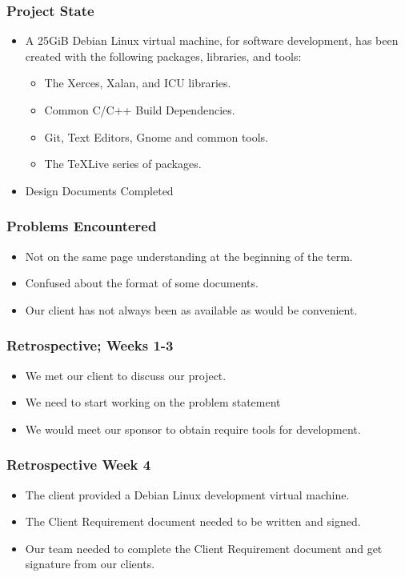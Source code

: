 \documentclass[pdf]{beamer}
\begin{document}
\begin{frame}
  \frametitle{Project State}
  \begin{itemize}
    \item {
      A 25GiB Debian Linux virtual machine, for software development, has been created with the following packages, libraries, and tools:
     \begin{itemize}
       \item The Xerces, Xalan, and ICU libraries.
       \item Common C/C++ Build Dependencies.
       \item Git, Text Editors, Gnome and common tools.
       \item The TeXLive series of packages.
     \end{itemize}
    }
    \item Design Documents Completed
    \end{itemize}
\end{frame}

\begin{frame}
  \frametitle{Problems Encountered}
  \begin{itemize}
    \item Not on the same page understanding at the beginning of the term.
    \item Confused about the format of some documents.
    \item Our client has not always been as available as would be convenient. 
  \end{itemize}
\end{frame}

\begin{frame}
  \frametitle{Retrospective; Weeks 1-3}
  \begin{itemize}
    \item We met our client to discuss our project.
    \item We need to start working on the problem statement
    \item We would meet our sponsor to obtain require tools for development.
  \end{itemize}
\end{frame}

\begin{frame}
  \frametitle{Retrospective Week 4}
  \begin{itemize}
    \item The client provided a Debian Linux development virtual machine. 
    \item The Client Requirement document needed to be written and signed.
    \item Our team needed to complete the Client Requirement document and get signature from our clients. 
  \end{itemize}
\end{frame}
\end{document}
